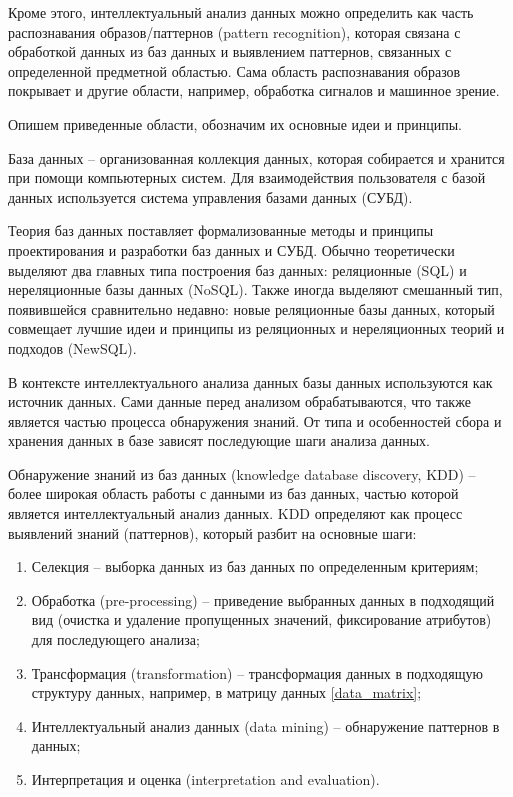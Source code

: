 Кроме этого, интеллектуальный анализ данных можно определить как часть
распознавания образов/паттернов (pattern recognition),
которая связана с обработкой данных из баз данных и выявлением паттернов, 
связанных с определенной предметной областью. \cite{mirkin-mining}
Сама область распознавания образов покрывает и другие области, например,
обработка сигналов и машинное зрение. \cite{mehmed-mining}

Опишем приведенные области, обозначим их основные идеи и принципы.

База данных -- организованная коллекция данных, которая собирается и хранится
при помощи компьютерных систем.
Для взаимодействия пользователя с базой данных используется
система управления базами данных (СУБД).

Теория баз данных поставляет формализованные методы и принципы проектирования и разработки баз данных и СУБД.
Обычно теоретически выделяют два главных типа построения баз данных: реляционные (SQL) и нереляционные базы данных (NoSQL).
Также иногда выделяют смешанный тип, появившейся сравнительно недавно:
новые реляционные базы данных, который совмещает лучшие
идеи и принципы из реляционных и нереляционных теорий и подходов (NewSQL). \cite{fauler-db}

В контексте интеллектуального анализа данных базы данных используются как источник данных.
Сами данные перед анализом обрабатываются, что также является частью процесса обнаружения знаний.
От типа и особенностей сбора и хранения данных в базе зависят последующие шаги анализа данных.



Обнаружение знаний из баз данных (knowledge database discovery, KDD) --  более широкая область
работы с данными из баз данных, частью которой является интеллектуальный анализ данных.
KDD определяют как процесс выявлений знаний (паттернов), который разбит на основные шаги: \cite{curr}

\begin{enumerate}
    \item Селекция -- выборка данных из баз данных по определенным критериям;
    \item Обработка (pre-processing) -- приведение выбранных данных в подходящий вид 
    (очистка и удаление пропущенных значений, фиксирование атрибутов) для последующего анализа;
    \item Трансформация (transformation) -- трансформация данных в подходящую структуру данных, например, в матрицу данных \eqref{data_matrix};
    \item Интеллектуальный анализ данных (data mining) -- обнаружение паттернов в данных;
    \item Интерпретация и оценка (interpretation and evaluation).
\end{enumerate}

